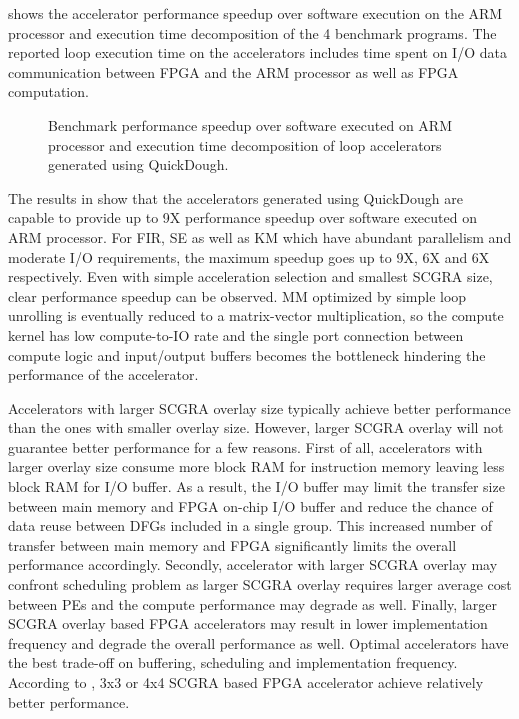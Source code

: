  shows the accelerator performance speedup over software execution on the ARM processor 
and execution time decomposition of the 4 benchmark programs. The reported loop execution
time on the accelerators includes time spent on I/O data communication between FPGA and the 
ARM processor as well as FPGA computation.

\begin{figure}
\vspace{-1em}
\centering
{}
\qquad
{}
\qquad
{}
\qquad
{}
\caption{Benchmark performance speedup over software executed on ARM processor and execution time 
    decomposition of loop accelerators generated using QuickDough.}
\label{fig:real-perf}
\vspace{-1.2em}
\end{figure}

The results in  show that the accelerators generated using QuickDough are 
capable to provide up to 9X performance speedup over software executed on ARM processor. For FIR, SE 
as well as KM which have abundant parallelism and moderate I/O requirements, the maximum speedup
goes up to 9X, 6X and 6X respectively. Even with simple acceleration selection and smallest SCGRA
size, clear performance speedup can be observed. MM optimized by simple loop unrolling is eventually reduced to
a matrix-vector multiplication, so the compute kernel has low compute-to-IO rate and the single port
connection between compute logic and input/output buffers becomes the bottleneck hindering
the performance of the accelerator.  

Accelerators with larger SCGRA overlay size typically achieve
better performance than the ones with smaller overlay size. However, larger SCGRA overlay will not
guarantee better performance for a few reasons. First of all, accelerators with larger overlay size consume
more block RAM for instruction memory leaving less block RAM for I/O buffer. As a result, the I/O
buffer may limit the transfer size between main memory and FPGA on-chip I/O buffer and reduce the
chance of data reuse between DFGs included in a single group. This increased number of transfer
between main memory and FPGA significantly limits the overall performance accordingly. Secondly, 
accelerator with larger SCGRA overlay may confront scheduling problem as larger SCGRA
overlay requires larger average cost between PEs and the compute performance may degrade as well.
Finally, larger SCGRA overlay based FPGA accelerators may result in lower implementation frequency
and degrade the overall performance as well. Optimal accelerators have the best trade-off on
buffering, scheduling and implementation frequency. According to , 3x3 or 4x4
SCGRA based FPGA accelerator achieve relatively better performance.

